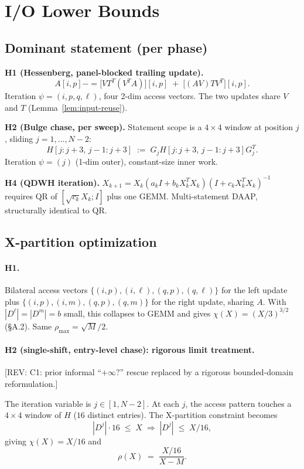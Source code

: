 \documentclass[11pt]{article}
\newcommand{\REV}[1]{\textcolor{blue!60!black}{\small\textsf{[REV: #1]}}}
\begin{document}
\section{I/O Lower Bounds}
\label{sec:B2}

\subsection{Dominant statement (per phase)}
\label{sec:B2a}

\textbf{H1 (Hessenberg, panel-blocked trailing update).}
\[
  A[i,p] \mathrel{{-}{=}}
   \big[V T^T (V^T A)\big][i,p]
   \;+\; \big[(A V) T V^T\big][i,p].
\]
Iteration $\psi = (i,p,q,\ell)$, four 2-dim access vectors. The two
updates share $V$ and $T$ (Lemma~\ref{lem:input-reuse}).

\textbf{H2 (Bulge chase, per sweep).} Statement scope is a $4 \times 4$
window at position $j$, sliding $j = 1,\ldots,N-2$:
\[
  H[j{:}j{+}3,\,j{-}1{:}j{+}3]
  \;:=\; G_j H[j{:}j{+}3,\,j{-}1{:}j{+}3] G_j^T.
\]
Iteration $\psi = (j)$ (1-dim outer), constant-size inner work.

\textbf{H4 (QDWH iteration).}
$X_{k+1} = X_k(a_k I + b_k X_k^T X_k)(I + c_k X_k^T X_k)^{-1}$
requires QR of $[\sqrt{c_k} X_k; I]$ plus one GEMM. Multi-statement
DAAP, structurally identical to QR.

\subsection{X-partition optimization}
\label{sec:B2b}

\paragraph{H1.}
Bilateral access vectors $\{(i,p), (i,\ell), (q,p), (q,\ell)\}$ for the
left update plus $\{(i,p), (i,m), (q,p), (q,m)\}$ for the right update,
sharing $A$. With $|D^\ell| = |D^m| = b$ small, this collapses to GEMM
and gives $\chi(X) = (X/3)^{3/2}$ (\S A.2). Same
$\rho_{\max} = \sqrt{M}/2$.

\paragraph{H2 (single-shift, entry-level chase): rigorous limit treatment.}
\REV{C1: prior informal ``$+\infty?$'' rescue replaced by a rigorous
bounded-domain reformulation.}

The iteration variable is $j \in [1, N-2]$. At each $j$, the access
pattern touches a $4 \times 4$ window of $H$ ($16$ distinct entries).
The X-partition constraint becomes
\[
  |D^j| \cdot 16 \;\le\; X
  \;\Longrightarrow\;
  |D^j| \;\le\; X/16,
\]
giving $\chi(X) = X/16$ and
\[
  \rho(X) \;=\; \frac{X/16}{X-M}.
\]
\end{document}
